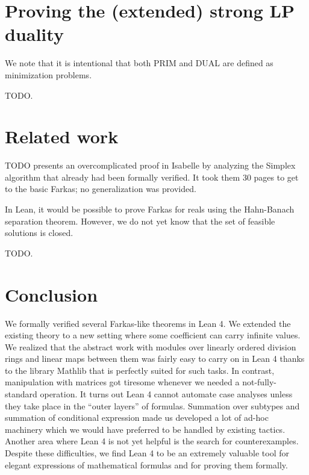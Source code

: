 \documentclass[]{article}
\renewcommand{\.}{\hskip .75pt}
\begin{document}
\section {Proving the (extended) strong LP duality}

We note that it is intentional that both PRIM and DUAL are defined as
minimization problems.

TODO.


\section {Related work}

TODO presents an overcomplicated proof in Isabelle by analyzing
the Simplex algorithm that already had been formally verified.
It took them 30 pages to get to the basic Farkas; no generalization
was provided.

In Lean, it would be possible to prove Farkas for reals using the
Hahn-Banach separation theorem. However, we do not yet know that
the set of feasible solutions is closed.

TODO.


\section {Conclusion}

We formally verified several Farkas-like theorems in Lean 4.
We extended the existing theory to a new setting where some
coefficient can carry infinite values. We realized that the
abstract work with modules over linearly ordered division rings
and linear maps between them was fairly easy to carry on in
Lean 4 thanks to the library Mathlib that is perfectly suited
for such tasks. In contrast, manipulation with matrices got
tiresome whenever we needed a not-fully-standard operation.
It turns out Lean 4 cannot automate case analyses unless they
take place in the ``outer layers'' of formulas. Summation
over subtypes and summation of conditional expression made
us developed a lot of ad-hoc machinery which we would have
preferred to be handled by existing tactics. Another area
where Lean 4 is not yet helpful is the search for counterexamples.
Despite these difficulties, we find Lean 4 to be an extremely
valuable tool for elegant expressions of mathematical formulas
and for proving them formally.
\end{document}
